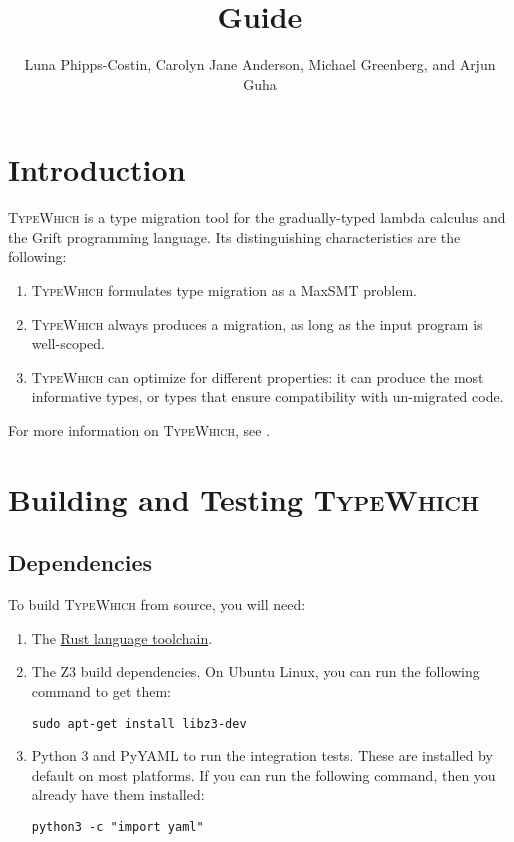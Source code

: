 \documentclass{article}
\title{\system Guide}
\author{Luna Phipps-Costin, Carolyn Jane Anderson, Michael Greenberg, and Arjun Guha}
\newcommand{\system}{\textsc{TypeWhich}\xspace}
\begin{document}
\maketitle

\tableofcontents

\section{Introduction}

\system is a type migration tool for the gradually-typed lambda calculus and
the Grift programming language. Its distinguishing characteristics are the following:

\begin{enumerate}

\item \system formulates type migration as a MaxSMT problem.

\item \system always produces a migration, as long as the input program is
   well-scoped.

\item \system can optimize for different properties: it can produce the most
informative types, or types that ensure compatibility with un-migrated code.

\end{enumerate}

For more information on \system, see \citet{typewhich}.

\section{Building and Testing \system}

\subsection{Dependencies}

To build \system from source, you will need:

\begin{enumerate}

\item The \href{https://rustup.rs/}{Rust language toolchain}.

\item The Z3 build dependencies. On Ubuntu Linux, you can run the following
command to get them:

\begin{verbatim}
sudo apt-get install libz3-dev
\end{verbatim}

\item Python 3 and PyYAML to run the integration tests. These are installed by
   default on most platforms. If you can run the following command, then you
   already have them installed:
\begin{verbatim}
python3 -c "import yaml"
\end{verbatim}

\end{enumerate}
\end{document}
